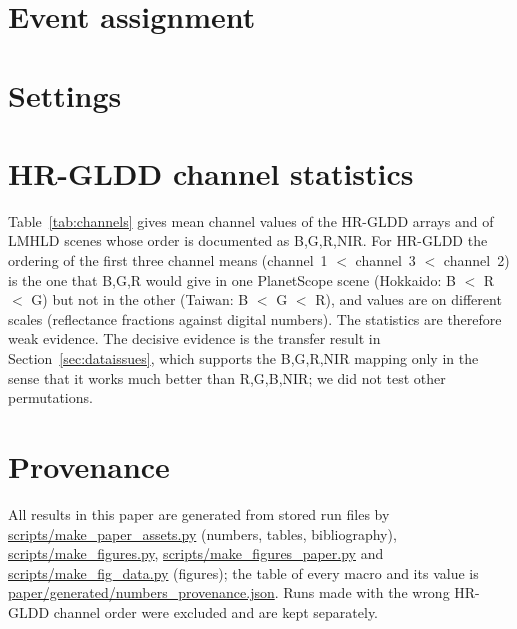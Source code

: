 \documentclass[11pt]{article}
\begin{document}
\section{Event assignment}\label{app:events}
\begin{table}[H]\centering\scriptsize

\caption{Documented physical events per dataset (T: tiles carry the event identifier; D: listed in the dataset paper only). Source: \texttt{configs/dataset\_events.json}; some assignments are inferred from place names.}\label{tab:events}
\end{table}

\section{Settings}
\begin{table}[H]\centering\small
\resizebox{\textwidth}{!}{}
\caption{Training settings.}\label{tab:hparams}
\end{table}

\section{HR-GLDD channel statistics}\label{app:channels}
Table~\ref{tab:channels} gives mean channel values of the HR-GLDD arrays and of LMHLD scenes whose order is documented as B,G,R,NIR. For HR-GLDD the ordering of the first three channel means (channel~1 $<$ channel~3 $<$ channel~2) is the one that B,G,R would give in one PlanetScope scene (Hokkaido: B $<$ R $<$ G) but not in the other (Taiwan: B $<$ G $<$ R), and values are on different scales (reflectance fractions against digital numbers). The statistics are therefore weak evidence. The decisive evidence is the transfer result in Section~\ref{sec:dataissues}, which supports the B,G,R,NIR mapping only in the sense that it works much better than R,G,B,NIR; we did not test other permutations.
\begin{table}[H]\centering\small
\resizebox{\textwidth}{!}{}
\caption{Mean channel values (HR-GLDD: reflectance fractions in array order; LMHLD: digital numbers in documented B,G,R,NIR order).}\label{tab:channels}
\end{table}

\section{Provenance}
All results in this paper are generated from \NumRunsTotal{} stored run files by \url{scripts/make_paper_assets.py} (numbers, tables, bibliography), \url{scripts/make_figures.py}, \url{scripts/make_figures_paper.py} and \url{scripts/make_fig_data.py} (figures); the table of every macro and its value is \url{paper/generated/numbers_provenance.json}. Runs made with the wrong HR-GLDD channel order were excluded and are kept separately.
\end{document}

